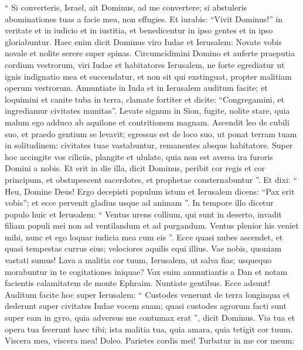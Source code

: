 \begin{biblechapter}
\begin{biblechapter}
\begin{biblechapter}
\begin{biblechapter}
\verse “ Si converteris, Israel,
 ait Dominus,
 ad me convertere;
 si abstuleris abominationes tuas a facie mea,
 non effugies.
 \verse Et iurabis: “Vivit Dominus!”
 in veritate et in iudicio et in iustitia,
 et benedicentur in ipso gentes
 et in ipso gloriabuntur.
 \verse Haec enim dicit Dominus
 viro Iudae et Ierusalem:
 Novate vobis novale
 et nolite serere super spinas.
 \verse Circumcidimini Domino
 et auferte praeputia cordium vestrorum,
 viri Iudae et habitatores Ierusalem,
 ne forte egrediatur ut ignis indignatio mea
 et succendatur, et non sit qui exstinguat,
 propter malitiam operum vestrorum.
 \verse Annuntiate in Iuda
 et in Ierusalem auditum facite;
 et loquimini et canite tuba in terra,
 clamate fortiter et dicite:
 “Congregamini, et ingrediamur civitates munitas”.
 \verse Levate signum in Sion,
 fugite, nolite stare,
 quia malum ego adduco ab aquilone
 et contritionem magnam.
 \verse Ascendit leo de cubili suo,
 et praedo gentium se levavit;
 egressus est de loco suo,
 ut ponat terram tuam in solitudinem:
 civitates tuae vastabuntur,
 remanentes absque habitatore.
 \verse Super hoc accingite vos ciliciis,
 plangite et ululate,
 quia non est aversa ira furoris Domini a nobis.
 \verse Et erit in die illa,
 dicit Dominus,
 peribit cor regis
 et cor principum,
 et obstupescent sacerdotes,
 et prophetae consternabuntur ”.
 \verse Et dixi: “ Heu, Domine Deus!
 Ergo decepisti populum istum et Ierusalem
 dicens: “Pax erit vobis”;
 et ecce pervenit gladius usque ad animam ”.
 \verse In tempore illo dicetur populo huic et Ierusalem:
 “ Ventus urens collium, qui sunt in deserto,
 invadit filiam populi mei
 non ad ventilandum et ad purgandum.
 \verse Ventus plenior his veniet mihi,
 nunc et ego loquar iudicia mea cum eis ”.
 \verse Ecce quasi nubes ascendet,
 et quasi tempestas currus eius;
 velociores aquilis equi illius.
 Vae nobis, quoniam vastati sumus!
 \verse Lava a malitia cor tuum,
 Ierusalem, ut salva fias;
 usquequo morabuntur in te
 cogitationes iniquae?
 \verse Vox enim annuntiantis a Dan
 et notam facientis calamitatem de monte Ephraim.
 \verse Nuntiate gentibus. Ecce adsunt!
 Auditum facite hoc super Ierusalem:
 “ Custodes venerunt de terra longinqua
 et dederunt super civitates Iudae vocem suam;
 \verse quasi custodes agrorum facti sunt super eam in gyro,
 quia adversus me contumax erat ”,
 dicit Dominus.
 \verse Via tua et opera tua
 fecerunt haec tibi;
 ista malitia tua, quia amara,
 quia tetigit cor tuum.
 \verse Viscera mea, viscera mea! Doleo.
 Parietes cordis mei!
 Turbatur in me cor meum:

\end{biblechapter}
\end{biblechapter}
\end{biblechapter}
\end{biblechapter}
